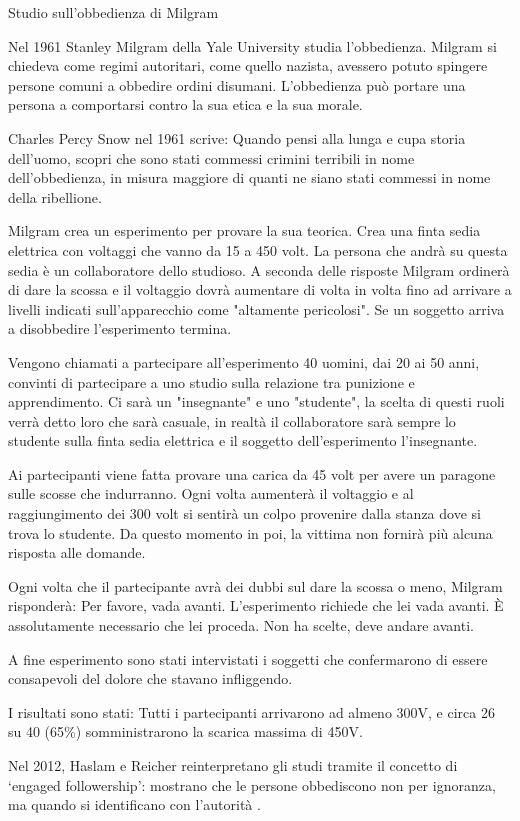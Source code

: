 \documentclass[12pt]{book} %
\begin{document}
\begin{mdframed}[linewidth=1pt]
Studio sull'obbedienza di Milgram

Nel 1961 Stanley Milgram della Yale University studia l'obbedienza. Milgram si chiedeva come regimi autoritari, come quello nazista, avessero potuto spingere persone comuni a obbedire ordini disumani.
L'obbedienza può portare una persona a comportarsi contro la sua etica e la sua morale.

Charles Percy Snow nel 1961 scrive: Quando pensi alla lunga e cupa storia dell'uomo, scopri che
sono stati commessi crimini terribili in nome dell'obbedienza, in misura maggiore di quanti ne
siano stati commessi in nome della ribellione.

Milgram crea un esperimento per provare la sua teorica. Crea una finta sedia elettrica con voltaggi che vanno da 15 a 450
volt. La persona che andrà su questa sedia è un collaboratore dello studioso. A seconda delle risposte Milgram ordinerà
di dare la scossa e il voltaggio dovrà aumentare di volta in volta fino ad arrivare a livelli indicati sull'apparecchio
come "altamente pericolosi". Se un soggetto arriva a disobbedire l'esperimento termina.

Vengono chiamati a partecipare all'esperimento 40 uomini, dai 20 ai 50 anni, convinti di partecipare a uno studio sulla
relazione tra punizione e apprendimento. Ci sarà un "insegnante" e uno
"studente", la scelta di questi ruoli verrà detto loro che sarà casuale, in realtà il
collaboratore sarà sempre lo studente sulla finta sedia elettrica e il soggetto dell'esperimento l'insegnante.

Ai partecipanti viene fatta provare una carica da 45 volt per avere un paragone sulle scosse che indurranno. Ogni volta
aumenterà il voltaggio e al raggiungimento dei 300 volt si sentirà un colpo provenire dalla stanza dove si trova lo
studente. Da questo momento in poi, la vittima non fornirà più alcuna risposta alle domande.

Ogni volta che il partecipante avrà dei dubbi sul dare la scossa o meno, Milgram risponderà: Per favore, vada avanti.
L'esperimento richiede che lei vada avanti. È assolutamente necessario che lei proceda. Non ha
scelte, deve andare avanti.

A fine esperimento sono stati intervistati i soggetti che confermarono di essere consapevoli del dolore che stavano
infliggendo. 

I risultati sono stati: Tutti i partecipanti arrivarono ad almeno 300V, e circa 26 su 40 (65\%) somministrarono la scarica massima di 450V.

Nel 2012, Haslam e Reicher reinterpretano gli studi tramite il concetto di ‘engaged followership’: mostrano che le persone obbediscono non per ignoranza, ma quando si identificano con l’autorità
. 
\end{mdframed}
\end{document}
